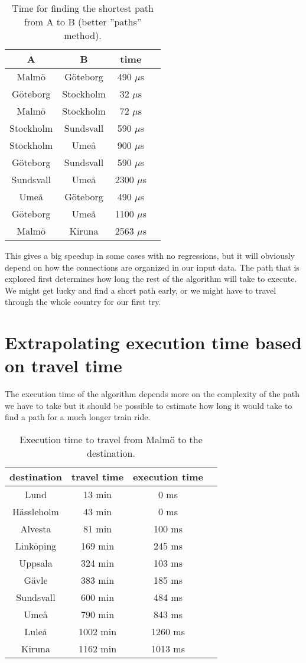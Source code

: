 \documentclass[a4paper,11pt]{article}
\begin{document}
\begin{table}[H]
\centering
\begin{tabular}{|c|c|c|c|}
\hline
\textbf{A} & \textbf{B} & \textbf{time} \\
\hline
	Malmö & Göteborg & 490 $\mu$s \\
	Göteborg & Stockholm & 32 $\mu$s \\
	Malmö & Stockholm & 72 $\mu$s \\
	Stockholm & Sundsvall & 590 $\mu$s \\
	Stockholm & Umeå & 900 $\mu$s \\
	Göteborg & Sundsvall & 590 $\mu$s \\
	Sundsvall & Umeå & 2300 $\mu$s \\
	Umeå & Göteborg & 490 $\mu$s \\
	Göteborg & Umeå & 1100 $\mu$s \\
	Malmö & Kiruna & 2563 $\mu$s \\
\hline
\end{tabular}
\caption{Time for finding the shortest path from A to B (better ''paths'' method).}
\label{tab:table3}
\end{table}

This gives a big speedup in some cases with no regressions, but it will obviously depend on how the connections are organized in our input data.
The path that is explored first determines how long the rest of the algorithm will take to execute. We might get lucky and find a short path early, or we might have to travel through the whole country for our first try.

\section*{Extrapolating execution time based on travel time}

The execution time of the algorithm depends more on the complexity of the path we have to take but it should be possible to estimate how long it would take to find a path for a much longer train ride.

\begin{table}[H]
\centering
\begin{tabular}{|c|c|c|c|}
\hline
\textbf{destination} & \textbf{travel time} & \textbf{execution time} \\
\hline
	Lund & 13 min & 0 ms \\
	Hässleholm & 43 min & 0 ms \\
	Alvesta & 81 min & 100 ms \\
	Linköping & 169 min & 245 ms \\
	Uppsala & 324 min & 103 ms \\
	Gävle & 383 min & 185 ms \\
	Sundsvall & 600 min & 484 ms \\
	Umeå & 790 min & 843 ms \\
	Luleå & 1002 min & 1260 ms \\
	Kiruna & 1162 min & 1013 ms \\
\hline
\end{tabular}
\caption{Execution time to travel from Malmö to the destination.}
\label{tab:table4}
\end{table}
\end{document}
